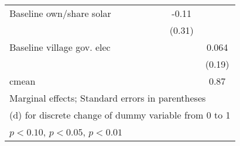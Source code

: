 \begin{table}[htbp]
\begin{tabular*}{1\hsize}{@{\hskip\tabcolsep\extracolsep\fill}l*{6}{c}}
Baseline own/share solar&                  &                  &                  &                  &    -0.11         &                  \\
                &                  &                  &                  &                  &   (0.31)         &                  \\
Baseline village gov. elec&                  &                  &                  &                  &                  &    0.064         \\
                &                  &                  &                  &                  &                  &   (0.19)         \\
\midrule
cmean           &                  &                  &                  &                  &                  &     0.87         \\
\bottomrule
\multicolumn{7}{l}{\footnotesize Marginal effects; Standard errors in parentheses}\\
\multicolumn{7}{l}{\footnotesize  (d) for discrete change of dummy variable from 0 to 1}\\
\multicolumn{7}{l}{\footnotesize \sym{*} \(p<0.10\), \sym{**} \(p<0.05\), \sym{***} \(p<0.01\)}\\
\end{tabular*}
\end{table}
